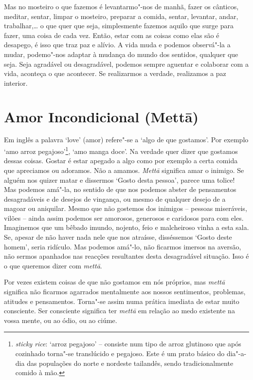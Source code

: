 Mas no mosteiro o que fazemos é levantarmo"-nos de manhã, fazer os
cânticos, meditar, sentar, limpar o mosteiro, preparar a
comida, sentar, levantar, andar, trabalhar,\ldots{} o que quer que
seja, simplesmente fazemos aquilo que surge para fazer, uma coisa de cada vez.
Então, estar com as coisas como elas são é desapego, é isso que traz paz
e alívio. A vida muda e podemos observá"-la a mudar, podemo"-nos adaptar à
mudança do mundo dos sentidos, qualquer que seja. Seja agradável ou
desagradável, podemos sempre aguentar e colaborar com a vida, aconteça o
que acontecer. Se realizarmos a verdade, realizamos a paz interior.

\chapter{Amor Incondicional (Mettā)}

Em inglês a palavra `love' (amor) refere"-se a `algo de que gostamos'.
Por exemplo `amo arroz pegajoso'\footnote{%
  \emph{sticky rice}: `arroz pegajoso' -- consiste num tipo de arroz
  glutinoso que após cozinhado torna"-se translúcido e pegajoso. Este é um
  prato básico do dia"-a-dia das populações do norte e nordeste tailandês,
  sendo tradicionalmente comido à mão.},
`amo manga doce'. Na
verdade quer dizer que gostamos dessas coisas. Gostar é estar apegado a
algo como por exemplo a certa comida que apreciamos ou adoramos. Não a
amamos. \emph{Mettā} significa amar o inimigo. Se alguém nos quizer
matar e dissermos `Gosto desta pessoa', parece uma tolice! Mas podemos
amá"-la, no sentido de que nos podemos abster de pensamentos
desagradáveis e de desejos de vingança, ou mesmo de qualquer desejo de a
magoar ou aniquilar. Mesmo que não gostemos dos inimigos -- pessoas
miseráveis, vilões -- ainda assim podemos ser amorosos, generosos e
caridosos para com eles. Imaginemos que um bêbado imundo, nojento, feio
e malcheiroso vinha a esta sala. Se, apesar de não haver nada nele que
nos atraísse, disséssemos `Gosto deste homem', seria ridículo. Mas
podemos amá"-lo, não ficarmos imersos na aversão, não sermos apanhados
nas reacções resultantes desta desagradável situação. Isso é o que
queremos dizer com \emph{mettā}.

Por vezes existem coisas de que não gostamos em nós próprios, mas
\emph{mettā} significa não ficarmos agarrados mentalmente aos nossos
sentimentos, problemas, atitudes e pensamentos. Torna"-se assim numa
prática imediata de estar muito consciente. Ser consciente significa ter
\emph{mettā} em relação ao medo existente na vossa mente, ou ao ódio, ou
ao ciúme.

